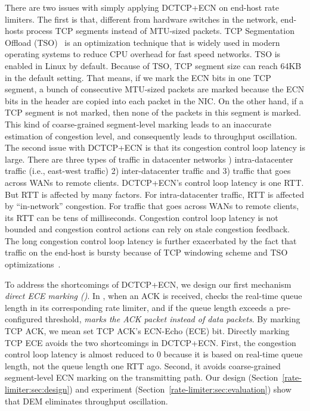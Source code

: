 There are two issues with simply applying DCTCP+ECN on end-host rate limiters. The first is that, different from
hardware switches in the network, end-hosts process TCP segments instead of MTU-sized packets. 
TCP Segmentation Offload (TSO)~\cite{tcp-segment-offload} is an optimization technique 
that is widely used in modern operating systems to reduce CPU overhead
for fast speed networks. TSO is enabled in Linux by default. Because of TSO, TCP segment size can reach
64KB in the default setting. That means, if we mark the ECN bits in one TCP segment, a bunch of 
consecutive MTU-sized packets are marked because the ECN bits in the header are copied into each packet in the NIC.
On the other hand, if a TCP segment is not marked, then none of the packets in this segment is marked. This kind of 
coarse-grained segment-level marking leads to an inaccurate estimation of congestion level, and consequently 
leads to throughput oscillation.
The second issue with DCTCP+ECN is that its congestion control loop latency is large. There are three types of 
traffic in datacenter networks \textemdash\xspace 1) intra-datacenter traffic (i.e., east-west traffic) 2) inter-datacenter
traffic and 3) traffic that goes across WANs to remote clients. DCTCP+ECN's control loop latency is one RTT.
But RTT is affected by many factors. For intra-datacenter traffic, RTT is affected by ``in-network'' congestion.
For traffic that goes across WANs to remote clients, its RTT can be tens of milliseconds.
Congestion control loop latency is not bounded and congestion control actions can rely on stale congestion feedback.
The long congestion control loop latency is further exacerbated by the fact that traffic on the end-host is bursty
because of TCP windowing scheme and TSO optimizations~\cite{kapoor2013bullet}.


To address the shortcomings of DCTCP+ECN, 
we design our first mechanism \textemdash\xspace \textit{direct ECE marking (\nameone)}. 
In \nameone, when an ACK is received, \nameone checks the real-time queue length in its corresponding rate limiter, 
and if the queue length exceeds a pre-configured threshold, \nameone \textit{marks the ACK packet instead of data packets}. 
By marking TCP ACK, we mean set TCP ACK's ECN-Echo (ECE) bit.
Directly marking TCP ECE avoids the two shortcomings in DCTCP+ECN. First, the congestion control loop
latency is almost reduced to 0 because it is based on real-time queue length, not the queue length one RTT ago.
Second, it avoids coarse-grained segment-level ECN marking on the transmitting path.
Our design (Section~\ref{rate-limiter:sec:design}) and experiment (Section~\ref{rate-limiter:sec:evaluation}) show that 
DEM eliminates throughput oscillation.
 

